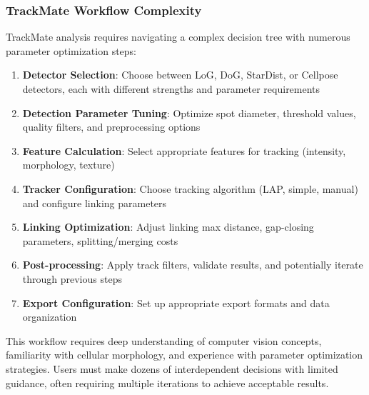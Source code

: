 \documentclass[12pt]{article}
\begin{document}


\subsubsection{TrackMate Workflow Complexity}

TrackMate analysis requires navigating a complex decision tree with numerous parameter optimization steps:

\begin{enumerate}
  \item \textbf{Detector Selection}: Choose between LoG, DoG, StarDist, or Cellpose detectors, each with different strengths and parameter requirements
  \item \textbf{Detection Parameter Tuning}: Optimize spot diameter, threshold values, quality filters, and preprocessing options
  \item \textbf{Feature Calculation}: Select appropriate features for tracking (intensity, morphology, texture)
  \item \textbf{Tracker Configuration}: Choose tracking algorithm (LAP, simple, manual) and configure linking parameters
  \item \textbf{Linking Optimization}: Adjust linking max distance, gap-closing parameters, splitting/merging costs
  \item \textbf{Post-processing}: Apply track filters, validate results, and potentially iterate through previous steps
  \item \textbf{Export Configuration}: Set up appropriate export formats and data organization
\end{enumerate}

This workflow requires deep understanding of computer vision concepts, familiarity with cellular morphology, and experience with parameter optimization strategies. Users must make dozens of interdependent decisions with limited guidance, often requiring multiple iterations to achieve acceptable results.
\end{document}

